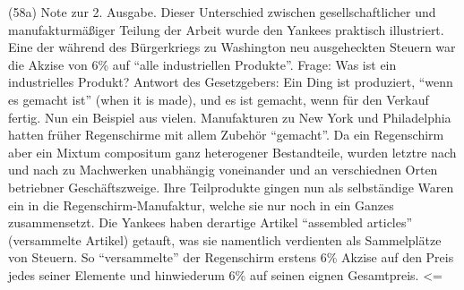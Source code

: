 {(58a) Note zur 2. Ausgabe. Dieser Unterschied zwischen
gesellschaftlicher und manufakturmäßiger Teilung der Arbeit wurde den
Yankees praktisch illustriert. Eine der während des Bürgerkriegs zu
Washington neu ausgeheckten Steuern war die Akzise von 6\% auf ``alle
industriellen Produkte''. Frage: Was ist ein industrielles Produkt?
Antwort des Gesetzgebers: Ein Ding ist produziert, ``wenn es gemacht
ist'' (when it is made), und es ist gemacht, wenn für den Verkauf
fertig. Nun ein Beispiel aus vielen. Manufakturen zu New York und
Philadelphia hatten früher Regenschirme mit allem Zubehör ``gemacht''.
Da ein Regenschirm aber ein Mixtum compositum ganz heterogener
Bestandteile, wurden letztre nach und nach zu Machwerken unabhängig
voneinander und an verschiednen Orten betriebner Geschäftszweige. Ihre
Teilprodukte gingen nun als selbständige Waren ein in die
Regenschirm-Manufaktur, welche sie nur noch in ein Ganzes zusammensetzt.
Die Yankees haben derartige Artikel ``assembled articles'' (versammelte
Artikel) getauft, was sie namentlich verdienten als Sammelplätze von
Steuern. So ``versammelte'' der Regenschirm erstens 6\% Akzise auf den
Preis jedes seiner Elemente und hinwiederum 6\% auf seinen eignen
Gesamtpreis. \textless{}=

}
